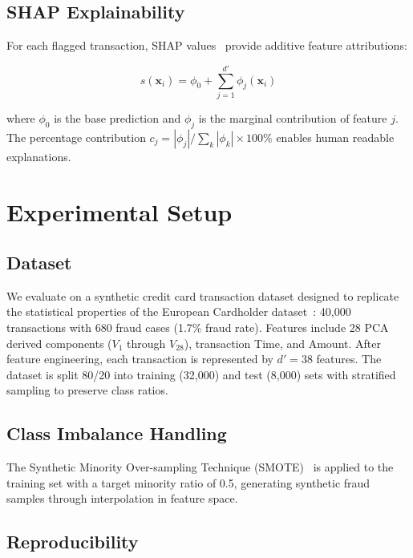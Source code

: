 \documentclass[conference]{IEEEtran}
\begin{document}
\subsection{SHAP Explainability}

For each flagged transaction, SHAP values~\cite{lundberg2017unified} provide additive feature attributions:

\begin{equation}
s(\mathbf{x}_i) = \phi_0 + \sum_{j=1}^{d'} \phi_j(\mathbf{x}_i)
\label{eq:shap}
\end{equation}

\noindent where $\phi_0$ is the base prediction and $\phi_j$ is the marginal contribution of feature $j$. The percentage contribution $c_j = |\phi_j| / \sum_k |\phi_k| \times 100\%$ enables human readable explanations.

\section{Experimental Setup}
\label{sec:experiments}

\subsection{Dataset}

We evaluate on a synthetic credit card transaction dataset designed to replicate the statistical properties of the European Cardholder dataset~\cite{dal_pozzolo2015calibrating}: 40{,}000 transactions with 680 fraud cases (1.7\% fraud rate). Features include 28 PCA derived components ($V_1$ through $V_{28}$), transaction Time, and Amount. After feature engineering, each transaction is represented by $d'=38$ features. The dataset is split 80/20 into training (32{,}000) and test (8{,}000) sets with stratified sampling to preserve class ratios.

\subsection{Class Imbalance Handling}

The Synthetic Minority Over-sampling Technique (SMOTE)~\cite{chawla2002smote} is applied to the training set with a target minority ratio of 0.5, generating synthetic fraud samples through interpolation in feature space.

\subsection{Reproducibility}
\end{document}
